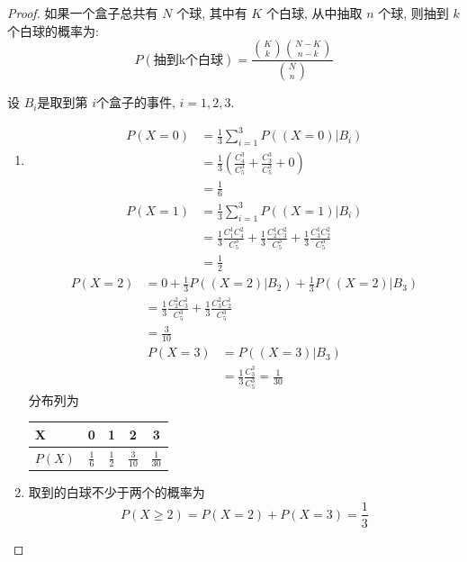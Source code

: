 \documentclass[../main.tex]{subfiles}
\begin{document}
\begin{proof}
    如果一个盒子总共有 $N$ 个球, 其中有 $K$ 个白球, 从中抽取 $n$ 个球, 则抽到 $k$ 个白球的概率为:
$$P(\text{抽到k个白球}) = \frac{\binom{K}{k} \binom{N-K}{n-k}}{\binom{N}{n}}$$
   
设 \(  B_{i}  \)是取到第 \(  i  \)个盒子的事件,  \(  i= 1,2,3  \). 

    \begin{enumerate}
        \item  \[
        \begin{aligned}
        P\left( X= 0 \right)&= \frac{1 }{3 }\sum _{i= 1}^{3}P\left( \left( X= 0 \right)|B_{i}  \right)\\ 
         &= \frac{1 }{3 }\left( \frac{ C_{4}^{3}}{C_{5}^{3} }+ \frac{C_{3}^{3} }{C_{5}^{3} }+ 0   \right)      \\ 
          &= \frac{1 }{6 } 
        \end{aligned}
        \] \[
        \begin{aligned}
        P\left( X = 1\right)&=\frac{1 }{3 }\sum _{i= 1}^{3}  P\left( \left( X= 1 \right)|B_i  \right)  \\ 
         &=  \frac{1 }{3 }\frac{ C_{1}^{1}C_{4}^{2}}{C_{5}^{3} }    + \frac{1 }{3 }\frac{C_{2}^{1}C_{3}^{2} }{C_{5}^{3} }+ \frac{1 }{3 }\frac{C_{3}^{1}C_{2}^{2} }{C_{5}^{3} }\\ 
          &=\frac{1 }{2 } 
        \end{aligned}
        \] \[
       \begin{aligned}
        P\left( X= 2 \right)&= 0+ \frac{1 }{3 } P\left( \left( X= 2 \right)|B_2  \right)+\frac{1 }{3 }  P\left( \left( X= 2 \right)|B_3  \right) \\ 
         &= \frac{1 }{3 }\frac{C_{2}^{2}C_{3}^{1} }{C_{5}^{3} }+ \frac{1 }{3 }   \frac{C_{3}^{2}C_{2}^{1} }{C_{5}^{3} }\\ 
          &=\frac{3 }{10 } 
       \end{aligned}   
        \] \[
        \begin{aligned}
        P\left( X= 3 \right)&= P\left( \left( X= 3 \right)|B_3  \right)\\ 
         &= \frac{1 }{3 }\frac{C_{3}^{3} }{C_{5}^{3} }= \frac{1 }{30 }      
        \end{aligned}
        \]
分布列为
        \begin{center}
            \begin{tabular}{l|cccc}
X & 0 & 1 & 2 & 3 \\
\hline
$P(X)$ & $\frac{1}{6}$ & $\frac{1}{2}$ & $\frac{3}{10}$ & $\frac{1}{30}$ \\
\end{tabular}
        \end{center}

        \item 取到的白球不少于两个的概率为 \[
        P\left( X\ge 2 \right)= P\left( X= 2 \right)+ P\left( X= 3 \right)= \frac{1 }{3 }    
        \]
    \end{enumerate}
       
\end{proof}
\end{document}
